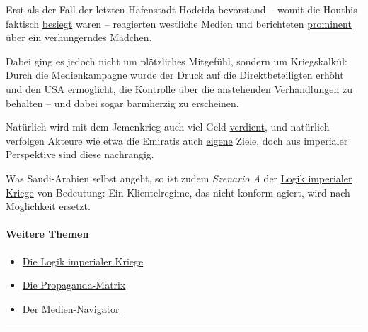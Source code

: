 Erst als der Fall der letzten Hafenstadt Hodeida bevorstand -- womit die
Houthis faktisch
\href{https://www.moonofalabama.org/2018/11/yemen-why-holding-hodeidah-is-the-houthis-last-chance.html}{besiegt}
wa­ren -- reagierten westliche Medien und berichteten
\href{https://www.nytimes.com/2018/11/01/world/middleeast/yemen-starvation-amal-hussain.html}{prominent}
über ein verhungerndes Mädchen.

Dabei ging es jedoch nicht um plötzliches Mitgefühl, sondern um
Kriegskalkül: Durch die Me­dien­kam­pagne wur­de der Druck auf die
Direktbeteiligten erhöht und den USA ermöglicht, die Kontrolle über die
anstehenden
\href{http://www.spiegel.de/politik/ausland/usa-draengen-saudi-arabien-zu-verhandlungen-mit-huthi-rebellen-im-jemen-a-1236141.html}{Verhandlungen}
zu behalten -- und dabei sogar barmherzig zu erscheinen.

Natürlich wird mit dem Jemenkrieg auch viel Geld
\href{https://www.tagesanzeiger.ch/schweiz/standard/saudische-soldaten-schiessen-mit-schweizer-waffen/story/15137707}{verdient},
und natürlich verfolgen Akteure wie etwa die Emiratis auch
\href{https://www.reuters.com/article/us-uae-security-yemen-somalia/uae-extends-military-reach-in-yemen-and-somalia-idUSKBN1IC12A}{eigene}
Ziele, doch aus imperialer Perspektive sind diese nachrangig.

Was Saudi-Arabien selbst angeht, so ist zudem \emph{Szenario A} der
\href{https://swprs.org/logik-imperialer-kriege/}{Logik imperialer
Kriege} von Bedeutung: Ein Klientelregime, das nicht konform agiert,
wird nach Möglichkeit ersetzt.

\hypertarget{weitere-themen}{%
\paragraph{Weitere Themen}\label{weitere-themen}}

\begin{itemize}
\tightlist
\item
  \href{https://swprs.org/logik-imperialer-kriege/}{Die Logik imperialer
  Kriege}
\item
  \href{https://swprs.org/die-propaganda-matrix/}{Die Propaganda-Matrix}
\item
  \href{https://swprs.org/medien-navigator/}{Der Medien-Navigator}
\end{itemize}

\begin{center}\rule{0.5\linewidth}{\linethickness}\end{center}

